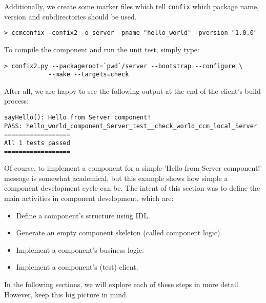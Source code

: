 \noindent
Additionally, we create some marker files which tell
{\tt confix} which package name, version and subdirectories
should be used.
\begin{small}
\begin{verbatim}
> ccmconfix -confix2 -o server -pname "hello_world" -pversion "1.0.0"
\end{verbatim}
\end{small}

\noindent
To compile the component and run the unit test, simply type: 
\begin{small}
\begin{verbatim}
> confix2.py --packageroot=`pwd`/server --bootstrap --configure \
            --make --targets=check
\end{verbatim}
\end{small}

\noindent
After all, we are happy to see the following output at the end of the client's
build process:

\begin{small}
\begin{verbatim}
sayHello(): Hello from Server component!
PASS: hello_world_component_Server_test__check_world_ccm_local_Server
==================
All 1 tests passed
==================
\end{verbatim}
\end{small}

\noindent
Of course, to implement a component for a simple 'Hello from Server component!'
message is somewhat academical, but this example shows how simple a component
development cycle can be. 
The intent of this section was to define the main activities in component 
development, which are:
\begin{itemize}
\item Define a component's structure using IDL.
\item Generate an empty component skeleton (called component logic).
\item Implement a component's business logic. 
\item Implement a component's (test) client.
\end{itemize}

\noindent
In the following sections, we will explore each of these steps in more
detail. However, keep this big picture in mind. 

